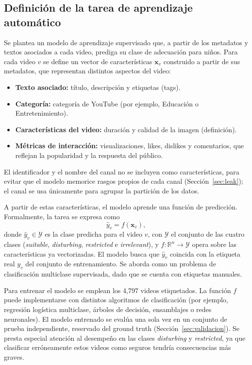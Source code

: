 \documentclass[conference]{IEEEtran}
\begin{document}
\subsection{Definición de la tarea de aprendizaje automático}
Se plantea un modelo de aprendizaje supervisado que, a partir de los metadatos y textos asociados a cada video, prediga su clase de adecuación para niños. Para cada video $v$ se define un vector de características $\mathbf{x}_v$ construido a partir de sus metadatos, que representan distintos aspectos del video:
\begin{itemize}
\item \textbf{Texto asociado:} título, descripción y etiquetas (tags).
\item \textbf{Categoría:} categoría de YouTube (por ejemplo, Educación o Entretenimiento).
\item \textbf{Características del video:} duración y calidad de la imagen (definición).
\item \textbf{Métricas de interacción:} visualizaciones, likes, dislikes y comentarios, que reflejan la popularidad y la respuesta del público.
\end{itemize}
El identificador y el nombre del canal no se incluyen como características, para evitar que el modelo memorice rasgos propios de cada canal (Sección~\ref{sec:leak}); el canal se usa únicamente para agrupar la partición de los datos.

A partir de estas características, el modelo aprende una función de predicción. Formalmente, la tarea se expresa como
\begin{equation}
\hat{y}_v = f(\mathbf{x}_v),\label{eq:f}
\end{equation}
donde $\hat{y}_v\in\mathcal{Y}$ es la clase predicha para el video $v$, con $\mathcal{Y}$ el conjunto de las cuatro clases (\textit{suitable}, \textit{disturbing}, \textit{restricted} e \textit{irrelevant}), y $f\colon\mathbb{R}^{n}\to\mathcal{Y}$ opera sobre las características ya vectorizadas. El modelo busca que $\hat{y}_v$ coincida con la etiqueta real $y_v$ del conjunto de entrenamiento. Se aborda como un problema de clasificación multiclase supervisada, dado que se cuenta con etiquetas manuales.

Para entrenar el modelo se emplean los 4,797 videos etiquetados. La función $f$ puede implementarse con distintos algoritmos de clasificación (por ejemplo, regresión logística multiclase, árboles de decisión, ensamblajes o redes neuronales). El modelo entrenado se evalúa una sola vez en un conjunto de prueba independiente, reservado del ground truth (Sección~\ref{sec:validacion}). Se presta especial atención al desempeño en las clases \textit{disturbing} y \textit{restricted}, ya que clasificar erróneamente estos videos como seguros tendría consecuencias más graves.
\end{document}
